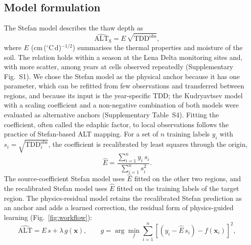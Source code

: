 \subsection{Model formulation}
The Stefan model describes the thaw depth as
\begin{equation}
\widehat{\mathrm{ALT}}_{\mathrm{S}} = E\,\sqrt{\mathrm{TDD}^{\mathrm{obs}}},
\label{eq:stefan}
\end{equation}
where $E$ (cm\,($^\circ$C\,d)$^{-1/2}$) summarises the thermal properties and moisture of the soil\cite{Stefan1891,Riseborough2008}. The relation holds within a season at the Lena Delta monitoring sites and, with more scatter, among years at cells observed repeatedly (Supplementary Fig.~S1). We chose the Stefan model as the physical anchor because it has one parameter, which can be refitted from few observations and transferred between regions, and because its input is the year-specific TDD; the Kudryavtsev model\cite{Kudryavtsev1974,RomanovskyOsterkamp1997} with a scaling coefficient and a non-negative combination of both models were evaluated as alternative anchors (Supplementary Table~S4). Fitting the coefficient, often called the edaphic factor, to local observations follows the practice of Stefan-based ALT mapping\cite{Nelson1997,ShiklomanovNelson2002}. For a set of $n$ training labels $y_i$ with $s_i = \sqrt{\mathrm{TDD}^{\mathrm{obs}}_i}$, the coefficient is recalibrated by least squares through the origin,
\begin{equation}
\hat{E} = \frac{\sum_{i=1}^{n} y_i\, s_i}{\sum_{i=1}^{n} s_i^{2}}.
\label{eq:E}
\end{equation}
The source-coefficient Stefan model uses $\hat{E}$ fitted on the other two regions, and the recalibrated Stefan model uses $\hat{E}$ fitted on the training labels of the target region. The physics-residual model retains the recalibrated Stefan prediction as an anchor and adds a learned correction, the residual form of physics-guided learning\cite{Willard2022} (Fig.~\ref{fig:workflow}):
\begin{equation}
\widehat{\mathrm{ALT}} = \hat{E}\, s + \lambda\, g(\mathbf{x}), \qquad g = \arg\min_{f} \sum_{i=1}^{n} \left[ \left( y_i - \hat{E}\, s_i \right) - f(\mathbf{x}_i) \right]^{2},
\label{eq:residual}
\end{equation}
